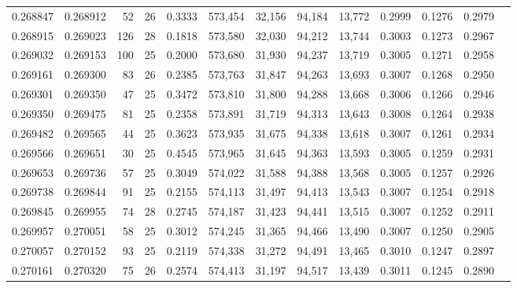 \begin{tabular}{rrrrrrrrrrrrr}
0.268847 & 0.268912 &  52 &  26 &                                     0.3333 & 573,454 &  32,156 &  94,184 &  13,772 & 0.2999 & 0.1276 & 0.2979 \\
0.268915 & 0.269023 & 126 &  28 &                                     0.1818 & 573,580 &  32,030 &  94,212 &  13,744 & 0.3003 & 0.1273 & 0.2967 \\
0.269032 & 0.269153 & 100 &  25 &                                     0.2000 & 573,680 &  31,930 &  94,237 &  13,719 & 0.3005 & 0.1271 & 0.2958 \\
0.269161 & 0.269300 &  83 &  26 &                                     0.2385 & 573,763 &  31,847 &  94,263 &  13,693 & 0.3007 & 0.1268 & 0.2950 \\
0.269301 & 0.269350 &  47 &  25 &                                     0.3472 & 573,810 &  31,800 &  94,288 &  13,668 & 0.3006 & 0.1266 & 0.2946 \\
0.269350 & 0.269475 &  81 &  25 &                                     0.2358 & 573,891 &  31,719 &  94,313 &  13,643 & 0.3008 & 0.1264 & 0.2938 \\
0.269482 & 0.269565 &  44 &  25 &                                     0.3623 & 573,935 &  31,675 &  94,338 &  13,618 & 0.3007 & 0.1261 & 0.2934 \\
0.269566 & 0.269651 &  30 &  25 &                                     0.4545 & 573,965 &  31,645 &  94,363 &  13,593 & 0.3005 & 0.1259 & 0.2931 \\
0.269653 & 0.269736 &  57 &  25 &                                     0.3049 & 574,022 &  31,588 &  94,388 &  13,568 & 0.3005 & 0.1257 & 0.2926 \\
0.269738 & 0.269844 &  91 &  25 &                                     0.2155 & 574,113 &  31,497 &  94,413 &  13,543 & 0.3007 & 0.1254 & 0.2918 \\
0.269845 & 0.269955 &  74 &  28 &                                     0.2745 & 574,187 &  31,423 &  94,441 &  13,515 & 0.3007 & 0.1252 & 0.2911 \\
0.269957 & 0.270051 &  58 &  25 &                                     0.3012 & 574,245 &  31,365 &  94,466 &  13,490 & 0.3007 & 0.1250 & 0.2905 \\
0.270057 & 0.270152 &  93 &  25 &                                     0.2119 & 574,338 &  31,272 &  94,491 &  13,465 & 0.3010 & 0.1247 & 0.2897 \\
0.270161 & 0.270320 &  75 &  26 &                                     0.2574 & 574,413 &  31,197 &  94,517 &  13,439 & 0.3011 & 0.1245 & 0.2890 \\

\end{tabular}
